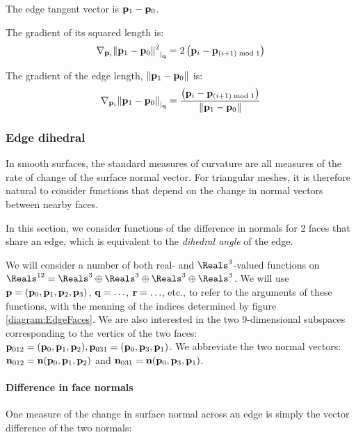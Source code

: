 The edge tangent vector is ${\mathbf p}_1 - {\mathbf p}_0$.

The gradient of its squared length is:
\begin{equation}
{\mathbf \nabla}_{{\mathbf p}_i}{{\| {\mathbf p}_1 - {\mathbf p}_0 \|^2}}_{\mid_{{\mathbf q}}} = 2 \left( {\mathbf p}_i - {\mathbf p}_{(i+1) \bmod 1} \right)
\end{equation}

The gradient of the edge length, $\|{\mathbf p}_1 - {\mathbf p}_0\|$ is:
\begin{equation}
{\mathbf \nabla}_{{\mathbf p}_i}{{\| {\mathbf p}_1 - {\mathbf p}_0 \|}}_{\mid_{{\mathbf q}}} =
\frac{\left( {\mathbf p}_i - {\mathbf p}_{(i+1) \bmod 1} \right)}
{\|{\mathbf p}_1 - {\mathbf p}_0\|}
\end{equation}


\subsubsection{Edge dihedral}
\label{sec:edge_dihedral}

In smooth surfaces,
the standard measures of curvature are all measures
of the rate of change of the surface normal vector.
For triangular meshes, it is therefore natural to
consider functions that depend on the change in
normal vectors between nearby faces.

In this section, we consider functions of the difference
in normals for 2 faces that share an edge,
which is equivalent to the {\it dihedral angle} of the edge.

We will consider a number of both real- and $\Reals^3$-valued functions on
$\Reals^{12} = \Reals^3 \oplus \Reals^3 \oplus \Reals^3 \oplus \Reals^3$.
We will use ${\mathbf p} = ({\mathbf p}_0, {\mathbf p}_1, {\mathbf p}_2, {\mathbf p}_3)$, ${\mathbf q}=\ldots$, ${\mathbf r}=\ldots$, etc.,
to refer to the arguments of these functions, with the meaning
of the indices determined by figure \ref{diagram:EdgeFaces}.
We are also interested in the two 9-dimensional subspaces
corresponding to the vertics of the two faces:
${\mathbf p}_{012} = ({\mathbf p}_0,{\mathbf p}_1,{\mathbf p}_2), {\mathbf p}_{031} = ({\mathbf p}_0,{\mathbf p}_3,{\mathbf p}_1)$.
We abbreviate the two normal vectors:
${\mathbf n}_{012} = {\mathbf n}({\mathbf p}_0,{\mathbf p}_1,{\mathbf p}_2)$
and
${\mathbf n}_{031} = {\mathbf n}({\mathbf p}_0,{\mathbf p}_3,{\mathbf p}_1)$.


\paragraph{Difference in face normals}
\label{sec:normal_difference}

One measure of the change in surface normal across an edge
is simply the vector difference of the two normals:

